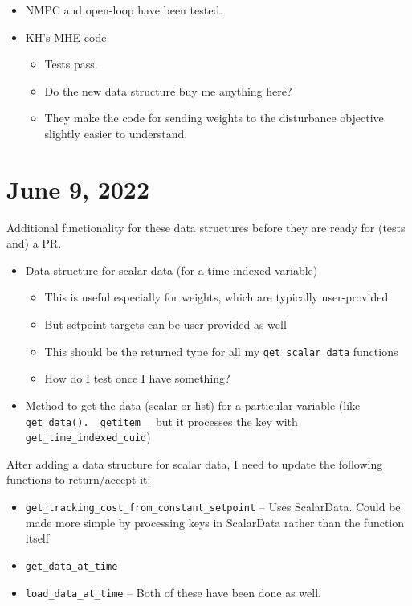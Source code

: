 \documentclass{article}
\begin{document}
\begin{itemize}
  \item NMPC and open-loop have been tested.
  \item KH's MHE code.
    \begin{itemize}
      \item Tests pass.
      \item Do the new data structure buy me anything here?
      \item They make the code for sending weights to the disturbance objective
        slightly easier to understand.
    \end{itemize}
\end{itemize}

\section{June 9, 2022}
Additional functionality for these data structures before they are
ready for (tests and) a PR.
\begin{itemize}
  \item Data structure for scalar data (for a time-indexed variable)
    \begin{itemize}
      \item This is useful especially for weights, which are typically
	user-provided
      \item But setpoint targets can be user-provided as well
      \item This should be the returned type for all my
	\texttt{get\_scalar\_data} functions
      \item How do I test once I have something?
    \end{itemize}
  \item Method to get the data (scalar or list) for a particular
    variable (like \texttt{get\_data().\_\_getitem\_\_} but it processes
    the key with \texttt{get\_time\_indexed\_cuid})
\end{itemize}

After adding a data structure for scalar data, I need to update
the following functions to return/accept it:
\begin{itemize}
  \item \texttt{get\_tracking\_cost\_from\_constant\_setpoint}
    -- Uses ScalarData. Could be made more simple by processing keys
    in ScalarData rather than the function itself
  \item \texttt{get\_data\_at\_time}
  \item \texttt{load\_data\_at\_time}
    -- Both of these have been done as well.
\end{itemize}
\end{document}
